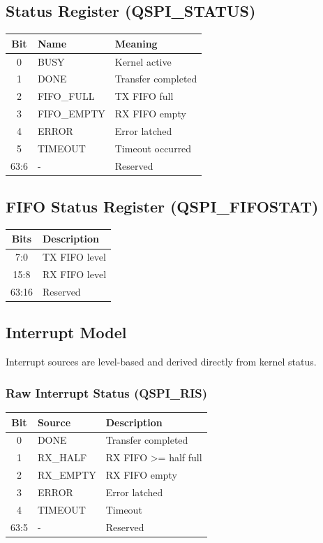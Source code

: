 \subsection{Status Register (QSPI\_STATUS)}

\begin{center}
\begin{tabular}{|c|l|l|}
\hline
Bit & Name & Meaning \\
\hline
0 & BUSY & Kernel active \\
1 & DONE & Transfer completed \\
2 & FIFO\_FULL & TX FIFO full \\
3 & FIFO\_EMPTY & RX FIFO empty \\
4 & ERROR & Error latched \\
5 & TIMEOUT & Timeout occurred \\
63:6 & - & Reserved \\
\hline
\end{tabular}
\end{center}

\subsection{FIFO Status Register (QSPI\_FIFOSTAT)}

\begin{center}
\begin{tabular}{|c|l|}
\hline
Bits & Description \\
\hline
7:0 & TX FIFO level \\
15:8 & RX FIFO level \\
63:16 & Reserved \\
\hline
\end{tabular}
\end{center}

\subsection{Interrupt Model}

Interrupt sources are level-based and derived directly from kernel status.

\subsubsection{Raw Interrupt Status (QSPI\_RIS)}

\begin{center}
\begin{tabular}{|c|l|l|}
\hline
Bit & Source & Description \\
\hline
0 & DONE & Transfer completed \\
1 & RX\_HALF & RX FIFO >= half full \\
2 & RX\_EMPTY & RX FIFO empty \\
3 & ERROR & Error latched \\
4 & TIMEOUT & Timeout \\
63:5 & - & Reserved \\
\hline
\end{tabular}
\end{center}

